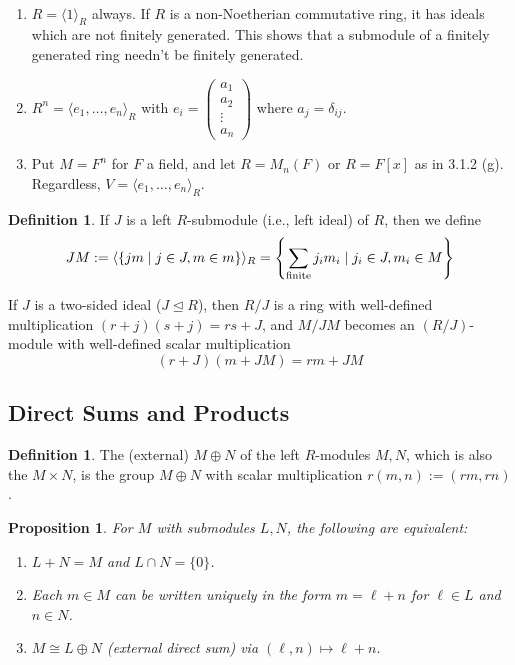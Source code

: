 \documentclass[11pt]{book}
\newcounter{counter}
\newtheorem{proposition}[counter]{Proposition}   \newtheorem{problem}[counter]{Problem}   \newtheorem*{proposition*}{Proposition}   \newtheorem*{lemma*}{Lemma}
\theoremstyle{definition}   \newtheorem{defn}[counter]{Definition} %
\newcommand{\nsg}{\mathrel{\unlhd}}   \newcommand{\ind}{\parindent24pt}   \newcommand{\vn}{\varnothing}
\newcommand{\mymatrix}[2]{\left( \begin{array}{#1} #2 \end{array} \right)}
\newcommand{\gen}[1]{\langle #1 \rangle}   \newcommand{\stab}[2]{\tn{Stab}_{#1}(#2)}   \newcommand{\fix}[2]{\tn{Fix}_{#1}(#2)}   \newcommand{\op}{^{\tn{op}}}
\newcommand{\vs}{\vspace{8pt}}
\numberwithin{counter}{chapter}
\begin{document}
\vs

\begin{example}\
\begin{enumerate}
\item[(a)] $R = \gen{1}_R$ always. If $R$ is a non-Noetherian commutative ring, it has ideals which are not finitely generated. This shows that a submodule of a finitely generated ring needn't be finitely generated.

\item[(b)] $R^n = \gen{e_1,\dots,e_n}_R$ with $e_i = \mymatrix{c}{a_1 \\ a_2 \\ \vdots \\ a_n}$ where $a_j = \delta_{ij}$.

\item[(c)] Put $M = F^n$ for $F$ a field, and let $R = M_n(F)$ or $R = F[x]$ as in 3.1.2 (g). Regardless, $V = \gen{e_1,\dots,e_n}_R$.
\end{enumerate}
\end{example}

\vs

\begin{defn}
If $J$ is a left $R$-submodule (i.e., left ideal) of $R$, then we define
	\[JM := \gen{\{ jm \mid j \in J, m \in m\}}_R = \left\{ \sum_{\tn{finite}} j_i m_i \mid j_i \in J, m_i \in M \right\} \]
\end{defn}

\vs

\begin{remark}
If $J$ is a two-sided ideal ($J \nsg R$), then $R/J$ is a ring with well-defined multiplication $(r+j)(s+j) = rs +J$, and $M/JM$ becomes an $(R/J)$-module with well-defined scalar multiplication
	\[(r+J)(m+JM) = rm + JM \]
\end{remark}

\subsection*{Direct Sums and Products}

\vs

\begin{defn}
The (external)  $M \oplus N$ of the left $R$-modules $M,N$, which is also the  $M \times N$, is the group $M \oplus N$ with scalar multiplication $r(m,n) := (rm,rn)$.
\end{defn}

\vs

\begin{proposition}
For $M$ with submodules $L,N$, the following are equivalent:
\begin{enumerate}
\item[(i)] $L+N = M$ and $L \cap N = \{0\}$.
\item[(ii)] Each $m \in M$ can be written uniquely in the form $m = \ell + n$ for $\ell \in L$ and $n \in N$.
\item[(iii)] $M \cong L \oplus N$ (external direct sum) via $(\ell,n) \mapsto \ell + n$.
\end{enumerate}
\end{proposition}
\end{document}
